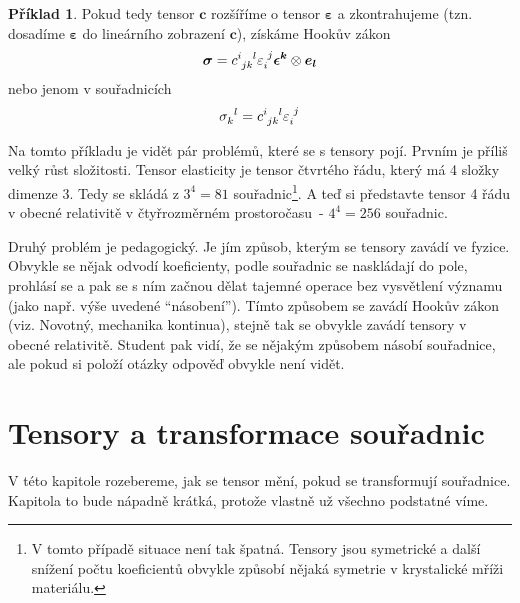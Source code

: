 \documentclass[a5paper,12pt]{amsbook}
\theoremstyle{definition}
\newtheorem{example}{Příklad}[chapter]
\newcommand{\myvec}[1]{\bm{#1}}
\begin{document}
\begin{example}
Pokud tedy tensor $\myvec{c}$ rozšíříme o tensor $\myvec{\varepsilon}$ a zkontrahujeme (tzn. dosadíme
$\myvec{\varepsilon}$ do lineárního zobrazení $\myvec{c}$), získáme Hookův zákon
\begin{equation*}
\begin{split}
\myvec{\sigma} = c\indices{^i_j_k^l}\varepsilon\indices{_i^j}\myvec{\epsilon^k}\otimes\myvec{e_l}
\end{split}
\end{equation*}
nebo jenom v souřadnicích
\begin{equation*}
\begin{split}
\sigma\indices{_k^l} = c\indices{^i_j_k^l}\varepsilon\indices{_i^j}
\end{split}
\end{equation*}

\medskip\noindent
Na tomto příkladu je vidět pár problémů, které se s tensory pojí. Prvním je příliš velký
růst složitosti. Tensor elasticity je tensor čtvrtého řádu, který má 4 složky dimenze
3. Tedy se skládá z $3^4 = 81$ souřadnic\footnote{
    V tomto případě situace není tak špatná. Tensory jsou symetrické a další snížení
    počtu koeficientů obvykle způsobí nějaká symetrie v krystalické mříži materiálu.}.
A teď si představte tensor 4 řádu v obecné relativitě v čtyřrozměrném
prostoročasu~- $4^4 = 256$ souřadnic.

Druhý problém je pedagogický. Je jím způsob, kterým se tensory zavádí ve fyzice.
Obvykle se nějak odvodí koeficienty, podle souřadnic se naskládají do pole,
prohlásí se  a pak se s ním začnou dělat tajemné operace
bez vysvětlení významu (jako např. výše uvedené ``násobení''). Tímto způsobem se
zavádí Hookův zákon (viz. Novotný, mechanika kontinua), stejně tak se obvykle
zavádí tensory v obecné relativitě. Student pak vidí, že se nějakým
způsobem násobí souřadnice, ale pokud si položí otázky  odpověď obvykle
není vidět.

\end{example}

\section{Tensory a transformace souřadnic}

\noindent
V této kapitole rozebereme, jak se tensor mění, pokud se transformují souřadnice.
Kapitola to bude nápadně krátká, protože vlastně už všechno podstatné víme.
\end{document}

